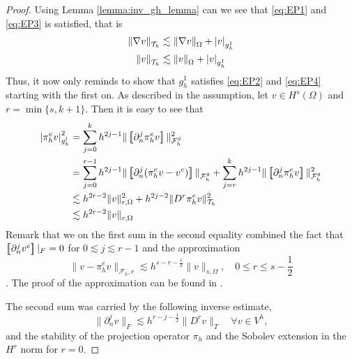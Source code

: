\begin{proof}
    Using Lemma \ref{lemma:inv_gh_lemma} can we see that \eqref{eq:EP1} and \eqref{eq:EP3} is satisfied, that is \[
    \begin{split}
        \| \nabla v \|_{ \mathcal{T} _{h} }^{  } & \lesssim \| \nabla v \|_{ \Omega  }^{  }  + \left\lvert  v  \right\rvert _{g_{h}^{1}} \\
        \|  v \|_{ \mathcal{T} _{h} }^{  } & \lesssim \|  v \|_{ \Omega  }^{  }  + \left\lvert  v  \right\rvert _{g_{h}^{1}}
    \end{split}
    \]
    Thus, it now only reminds to show that $g_{h}^{1}$  satisfies \eqref{eq:EP2} and \eqref{eq:EP4} starting with the first on. As described in the assumption, let $v \in H^{s}( \Omega ) $ and $r = \min \{s, k+1\} $. Then it is easy to see that \[
        \begin{split}
        \abs{ \pi ^{e}_{h} v }_{g_{h}^{l}}^{2} & = \sum_{j=0}^{k} h^{2j-1} \| \jump{ \partial ^{j}_{n}\pi ^{e}_{h} v  }  \|_{\mathcal{F} _{h}^{g}  }^{2  } \\
        &= \sum_{j=0}^{r-1} h^{2j -1} \| \jump{ \partial ^{j}_{n} ( \pi _{h}^{e} v - v^{e}) }    \|_{\mathcal{F} _{h}^{g}  }^{  } +  \sum_{j=r}^{k} h^{2j-1} \| \jump{ \partial ^{j}_{n} \pi ^{e}_{h} v }   \|_{\mathcal{F} _{h}^{g}  }^{ 2 }    \\
        & \lesssim h^{2r- 2}\| v \|_{ r,\Omega  }^{ 2 } + h^{2j-2}\| D^{r} \pi ^{e}_{h} v \|_{ \mathcal{T} _{h} }^{ 2 }   \\
        & \lesssim h^{2r -2 } \| v \|_{ r,\Omega  }^{  }
        \end{split}
    \]
    Remark that we on the first sum in the second equality combined the fact that $\left[\!\!\left[  \partial _{n}^{j} v^{e}  \right]\!\!\right]| _{F} = 0 $ for $0\lesssim j \lesssim r-1$ and the approximation \[
    \| v-\pi _{h}^{e} v \|_{ \mathcal{F} _{h},r  }^{  } \lesssim h^{s-r -\frac{1}{2}} \| v \|_{ s,\Omega  }^{  }, \quad 0 \le r \le  s-\frac{1}{2}
\]. The proof of the approximation can be found in \cite[Chapter 2.41]{gurkan2019stabilized}.

The second sum was carried by the following inverse estimate, \[
\| \partial ^{j}_{n}v \|_{ F }^{  }  \lesssim h^{r - j - \frac{1}{2}} \| D^{r} v \|_{ T }^{  } \quad  \forall v \in V^{h},
\]
and the stability of the projection operator $\pi _{h}$ and the Sobolev extension in the $H^{r}$ norm for $r=0$.
\end{proof}



